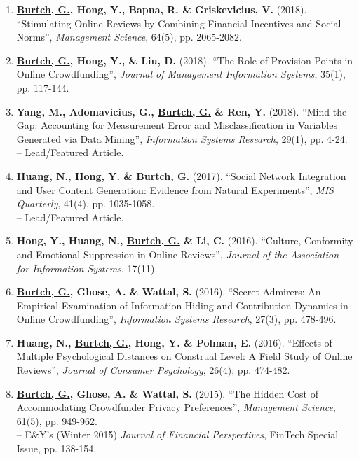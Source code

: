 \documentclass[10.5pt,letterpaper,sans]{moderncv}        %
\begin{document}
\begin{enumerate}[leftmargin=!,labelindent=5pt,itemindent=-15pt]
\item \textbf{\underline{Burtch, G.}, Hong, Y., Bapna, R. \& Griskevicius, V.} (2018). ``Stimulating Online Reviews by Combining Financial Incentives and Social Norms'', \textit{Management Science}, 64(5), pp. 2065-2082.

\item \textbf{\underline{Burtch, G.}, Hong, Y., \& Liu, D.} (2018). ``The Role of Provision Points in Online Crowdfunding'', \textit{Journal of Management Information Systems}, 35(1), pp. 117-144.

\item \textbf{Yang, M., Adomavicius, G., \underline{Burtch, G.} \& Ren, Y.} (2018). ``Mind the Gap: Accounting for Measurement Error and Misclassification in Variables Generated via Data Mining'', \textit{Information Systems Research}, 29(1), pp. 4-24. \\-- Lead/Featured Article.

\item \textbf{Huang, N., Hong, Y. \& \underline{Burtch, G.}} (2017). ``Social Network Integration and User Content Generation: Evidence from Natural Experiments'', \textit{MIS Quarterly}, 41(4), pp. 1035-1058. \\-- Lead/Featured Article.

\item \textbf{Hong, Y., Huang, N., \underline{Burtch, G.} \& Li, C.} (2016). ``Culture, Conformity and Emotional Suppression in Online Reviews'', \textit{Journal of the Association for Information Systems}, 17(11).

\item \textbf{\underline{Burtch, G.}, Ghose, A. \& Wattal, S.} (2016). ``Secret Admirers: An Empirical Examination of Information Hiding and Contribution Dynamics in Online Crowdfunding'', \textit{Information Systems Research}, 27(3), pp. 478-496.

\item \textbf{Huang, N., \underline{Burtch, G.}, Hong, Y. \& Polman, E.} (2016). ``Effects of Multiple Psychological Distances on Construal Level: A Field Study of Online Reviews'', \textit{Journal of Consumer Psychology}, 26(4), pp. 474-482.

\item \textbf{\underline{Burtch, G.}, Ghose, A. \& Wattal, S.} (2015). ``The Hidden Cost of Accommodating Crowdfunder Privacy Preferences'', \textit{Management Science}, 61(5), pp. 949-962. \\-- E\&Y's (Winter 2015) \textit{Journal of Financial Perspectives}, FinTech Special Issue, pp. 138-154.


\end{enumerate}
\end{document}
